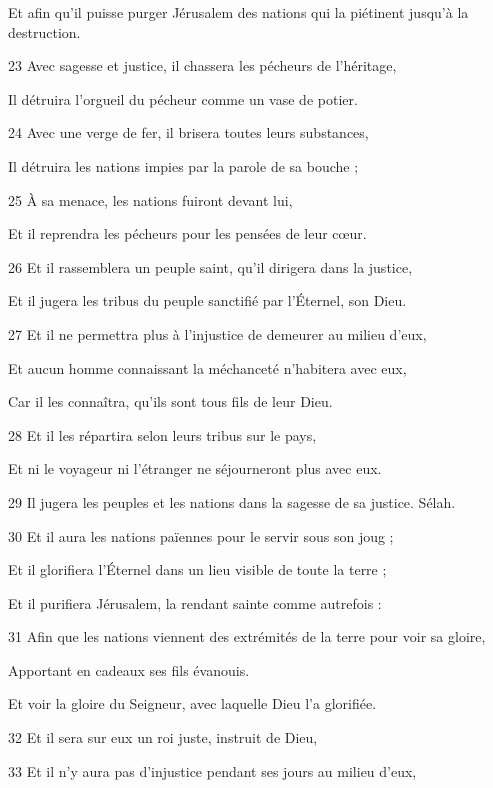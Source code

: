 \par     Et afin qu'il puisse purger Jérusalem des nations qui la piétinent jusqu'à la destruction.
\par 23 Avec sagesse et justice, il chassera les pécheurs de l'héritage,
\par     Il détruira l'orgueil du pécheur comme un vase de potier.
\par 24 Avec une verge de fer, il brisera toutes leurs substances,
\par     Il détruira les nations impies par la parole de sa bouche ;
\par 25 À sa menace, les nations fuiront devant lui,
\par     Et il reprendra les pécheurs pour les pensées de leur cœur.
\par   
\par 26 Et il rassemblera un peuple saint, qu'il dirigera dans la justice,
\par     Et il jugera les tribus du peuple sanctifié par l'Éternel, son Dieu.
\par 27 Et il ne permettra plus à l'injustice de demeurer au milieu d'eux,
\par     Et aucun homme connaissant la méchanceté n'habitera avec eux,
\par     Car il les connaîtra, qu'ils sont tous fils de leur Dieu.
\par 28 Et il les répartira selon leurs tribus sur le pays,
\par     Et ni le voyageur ni l'étranger ne séjourneront plus avec eux.
\par 29 Il jugera les peuples et les nations dans la sagesse de sa justice. Sélah.
\par   
\par 30 Et il aura les nations païennes pour le servir sous son joug ;
\par     Et il glorifiera l'Éternel dans un lieu visible de toute la terre ;
\par     Et il purifiera Jérusalem, la rendant sainte comme autrefois :
\par 31 Afin que les nations viennent des extrémités de la terre pour voir sa gloire,
\par     Apportant en cadeaux ses fils évanouis.
\par     Et voir la gloire du Seigneur, avec laquelle Dieu l'a glorifiée.
\par 32 Et il sera sur eux un roi juste, instruit de Dieu,
\par 33 Et il n'y aura pas d'injustice pendant ses jours au milieu d'eux,
